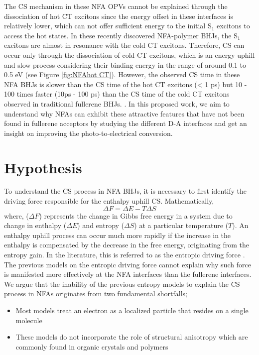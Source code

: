 \documentclass[12pt]{article}
\begin{document}
The CS mechanism in these NFA OPVs cannot be explained through the dissociation of hot CT excitons since the energy offset in these interfaces is relatively lower, which can not offer sufficient energy to the initial S$_1$ excitons to access the hot states. In these recently discovered NFA-polymer BHJs, the S$_1$ excitons are almost in resonance with the cold CT excitons. Therefore, CS can occur only through the dissociation of cold CT excitons, which is an energy uphill and slow process considering their binding energy in the range of around 0.1 to 0.5 eV (see Figure \ref{fig:NFAhot CT}). However, the observed CS time in these NFA BHJs is slower than the CS time of the hot CT excitons (< 1 ps) but 10 - 100 times faster (10ps - 100 ps) than the CS time of the cold CT excitons observed in traditional fullerene BHJs.  \cite{qian2018design,dimitrov2019spectroscopic,menke2018order,liu2018unexpectedly}. In this proposed work, we aim to understand why NFAs can exhibit these attractive features that have not been found in fullerene acceptors by studying the different D-A interfaces and get an insight on improving the photo-to-electrical conversion. 

\section{Hypothesis}
To understand the CS process in NFA BHJs, it is necessary to first identify the driving force responsible for the enthalpy uphill CS. Mathematically,
\begin{equation}
    \Delta F = \Delta E - T\Delta S
\end{equation}
where, ($\Delta F$) represents the change in Gibbs free energy in a system due to change in enthalpy ($\Delta E$) and entropy ($\Delta S$) at a particular temperature ($T$). An enthalpy uphill process can occur much more rapidly if the increase in the enthalpy is compensated by the decrease in the free energy, originating from the entropy gain. In the literature, this is referred to as the entropic driving force \cite{clarke2010charge,monahan2015direct,gregg2011entropy,hood2016entropy}. The previous models on the entropic driving force cannot explain why such force is manifested more effectively at the NFA interfaces than the fullerene interfaces. We argue that the inability of the previous entropy models to explain the CS process in NFAs originates from two fundamental shortfalls;
\begin{itemize}
    \item Most models treat an electron as a localized particle that resides on a single molecule
    \item These models do not incorporate the role of structural anisotropy which are commonly found in organic crystals and polymers
\end{itemize}
\end{document}

